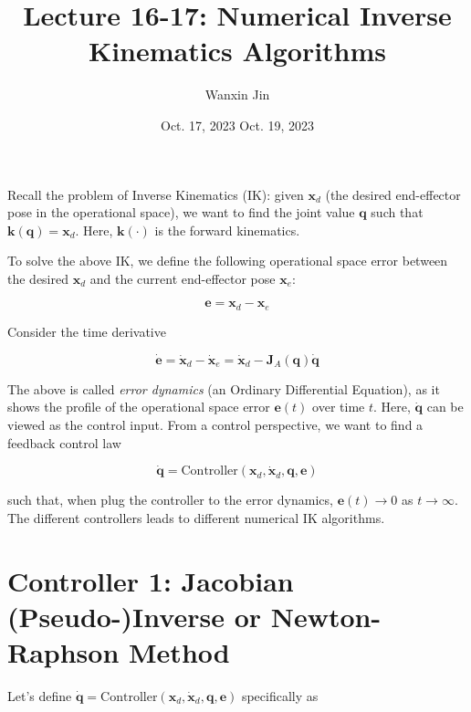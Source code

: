\documentclass[10pt]{article}
\begin{document}
\title{Lecture 16-17: Numerical Inverse Kinematics Algorithms}
\date{Oct. 17, 2023 \quad  \quad Oct. 19, 2023}
\author{Wanxin Jin}
\maketitle

Recall the problem of Inverse Kinematics (IK): given $\boldsymbol{x}_{d}$ (the desired end-effector pose in the operational space), we want to find the joint value $\boldsymbol{q}$ such that $\boldsymbol{k}(\boldsymbol{q})=\boldsymbol{x}_d$. Here, $\boldsymbol{k}(\cdot)$ is the forward kinematics.

To solve the above IK, we define the following operational space error between the desired $\boldsymbol{x}_{d}$  and the current end-effector pose $\boldsymbol{x}_{e}$: 



$$
\boldsymbol{e}=\boldsymbol{x}_{d}-\boldsymbol{x}_{e}
$$

Consider the time derivative

$$
\dot{\boldsymbol{e}}=\dot{\boldsymbol{x}}_{d}-\dot{\boldsymbol{x}}_{e}=\dot{\boldsymbol{x}}_{d}-\boldsymbol{J}_{A}(\boldsymbol{q}) \dot{\boldsymbol{q}}
$$

The above is called \emph{error dynamics} (an Ordinary Differential Equation), as it shows the profile of the operational space error $\boldsymbol{e}(t)$ over time $t$. Here, $\dot{\boldsymbol{q}}$ can be viewed as the control input.
From a control perspective, we want to find a feedback control law 

$$
\dot{\boldsymbol{q}}= \text{Controller}({\boldsymbol{x}}_d, \dot{\boldsymbol{x}}_d,  {\boldsymbol{q}}, {\boldsymbol{e}})
$$

such that, when plug the controller to the error dynamics,  $\boldsymbol{e}(t)\rightarrow 0$ as $t\rightarrow \infty$. The different controllers leads to different numerical IK algorithms.



\section{Controller 1: Jacobian (Pseudo-)Inverse or Newton-Raphson Method}



Let's define  $
\dot{\boldsymbol{q}}= \text{Controller}({\boldsymbol{x}}_d, \dot{\boldsymbol{x}}_d,  {\boldsymbol{q}}, {\boldsymbol{e}})
$ specifically as 
\end{document}
